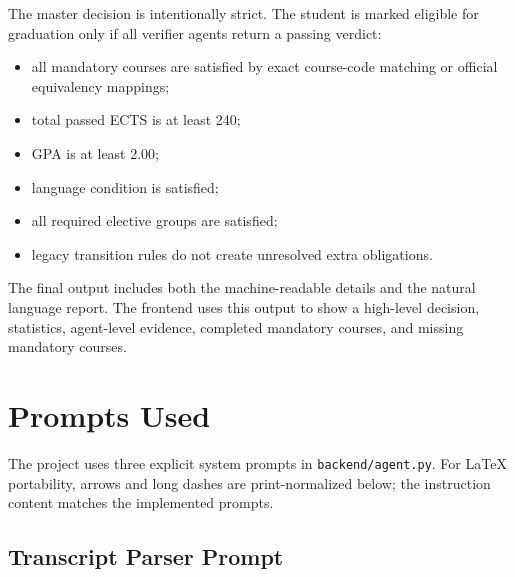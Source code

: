 \documentclass[11pt,a4paper]{article}
\begin{document}
The master decision is intentionally strict. The student is marked eligible for
graduation only if all verifier agents return a passing verdict:

\begin{itemize}
  \item all mandatory courses are satisfied by exact course-code matching or
  official equivalency mappings;
  \item total passed ECTS is at least 240;
  \item GPA is at least 2.00;
  \item language condition is satisfied;
  \item all required elective groups are satisfied;
  \item legacy transition rules do not create unresolved extra obligations.
\end{itemize}

The final output includes both the machine-readable details and the natural
language report. The frontend uses this output to show a high-level decision,
statistics, agent-level evidence, completed mandatory courses, and missing
mandatory courses.

\section{Prompts Used}

The project uses three explicit system prompts in \texttt{backend/agent.py}.
For LaTeX portability, arrows and long dashes are print-normalized below; the
instruction content matches the implemented prompts.

\subsection{Transcript Parser Prompt}
\end{document}
